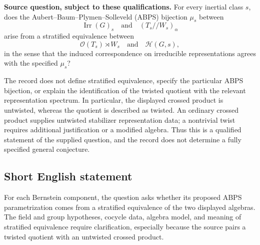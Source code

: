 \documentclass[11pt]{article}
\begin{document}
\textbf{Source question, subject to these qualifications.} For every inertial class \(s\), does the Aubert--Baum--Plymen--Solleveld (ABPS) bijection \(\mu_s\) between
\[
\operatorname{Irr}(G)_s
\quad\text{and}\quad
(T_s/\!/W_s)_\alpha
\]
arise from a stratified equivalence between
\[
\mathcal O(T_s)\rtimes W_s
\quad\text{and}\quad
\mathcal H(G,s),
\]
in the sense that the induced correspondence on irreducible representations agrees with the specified \(\mu_s\)?

The record does not define stratified equivalence, specify the particular ABPS bijection, or explain the identification of the twisted quotient with the relevant representation spectrum. In particular, the displayed crossed product is untwisted, whereas the quotient is described as twisted. An ordinary crossed product supplies untwisted stabilizer representation data; a nontrivial twist requires additional justification or a modified algebra. Thus this is a qualified statement of the supplied question, and the record does not determine a fully specified general conjecture.
\subsection{Short English statement}
For each Bernstein component, the question asks whether its proposed ABPS parametrization comes from a stratified equivalence of the two displayed algebras. The field and group hypotheses, cocycle data, algebra model, and meaning of stratified equivalence require clarification, especially because the source pairs a twisted quotient with an untwisted crossed product.
\end{document}
